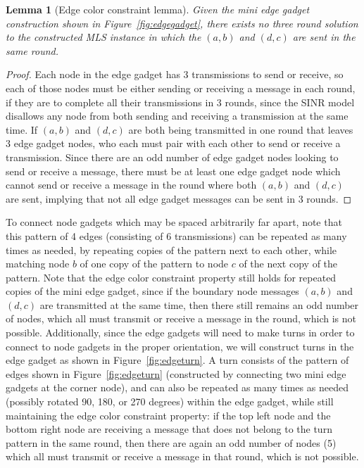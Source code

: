\documentclass{article}
\newtheorem{lemma}{Lemma}
\begin{document}
\begin{lemma}[Edge color constraint lemma]
Given the mini edge gadget construction shown in Figure~\ref{fig:edgegadget}, there exists no three round solution to the constructed MLS instance in which the $(a,b)$ and $(d,c)$ are sent in the same round.
\end{lemma}
\begin{proof}
Each node in the edge gadget has 3 transmissions to send or receive, so each of those nodes must be either sending or receiving a message in each round, if they are to complete all their transmissions in 3 rounds, since the SINR model disallows any node from both sending and receiving a transmission at the same time.  If $(a,b)$ and $(d,c)$ are both being transmitted in one round that leaves 3 edge gadget nodes, who each must pair with each other to send or receive a transmission.  Since there are an odd number of edge gadget nodes looking to send or receive a message, there must be at least one edge gadget node which cannot send or receive a message in the round where both $(a,b)$ and $(d,c)$ are sent, implying that not all edge gadget messages can be sent in 3 rounds.
\end{proof}

To connect node gadgets which may be spaced arbitrarily far apart, note that this pattern of 4 edges (consisting of 6 transmissions) can be repeated as many times as needed, by repeating copies of the pattern next to each other, while matching node $b$ of one copy of the pattern to node $c$ of the next copy of the pattern.  Note that the edge color constraint property still holds for repeated copies of the mini edge gadget, since if the boundary node messages $(a,b)$ and $(d,c)$ are transmitted at the same time, then there still remains an odd number of nodes, which all must transmit or receive a message in the round, which is not possible.  Additionally, since the edge gadgets will need to make turns in order to connect to node gadgets in the proper orientation, we will construct turns in the edge gadget as shown in Figure~\ref{fig:edgeturn}.   A turn consists of the pattern of edges shown in Figure~\ref{fig:edgeturn} (constructed by connecting two mini edge gadgets at the corner node), and can also be repeated as many times as needed (possibly rotated 90, 180, or 270 degrees) within the edge gadget, while still maintaining the edge color constraint property: if the top left node and the bottom right node are receiving a message that does not belong to the turn pattern in the same round, then there are again an odd number of nodes (5) which all must transmit or receive a message in that round, which is not possible.
\end{document}
